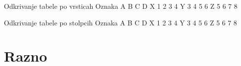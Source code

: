 \documentclass{beamer}
\begin{document}
   Odkrivanje tabele po vrsticah
      Oznaka A B C D
      X 1 2 3 4
      Y 3 4 5 6
      Z 5 6 7 8


   Odkrivanje tabele po stolpcih
      Oznaka A B C D
      X 1 2 3 4
      Y 3 4 5 6
      Z 5 6 7 8


\section{Razno}


\end{document}
